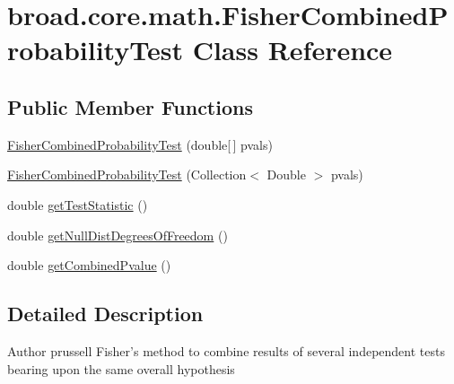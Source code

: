 \hypertarget{classbroad_1_1core_1_1math_1_1_fisher_combined_probability_test}{\section{broad.\+core.\+math.\+Fisher\+Combined\+Probability\+Test Class Reference}
\label{classbroad_1_1core_1_1math_1_1_fisher_combined_probability_test}
}
\subsection*{Public Member Functions}
\begin{DoxyCompactItemize}
\item 
\hyperlink{classbroad_1_1core_1_1math_1_1_fisher_combined_probability_test_a76aa0369ce1e5664e6d5b47314b64453}{Fisher\+Combined\+Probability\+Test} (double\mbox{[}$\,$\mbox{]} pvals)
\item 
\hyperlink{classbroad_1_1core_1_1math_1_1_fisher_combined_probability_test_a3a07dd76af6b6cc420e24494cbd39ca3}{Fisher\+Combined\+Probability\+Test} (Collection$<$ Double $>$ pvals)
\item 
double \hyperlink{classbroad_1_1core_1_1math_1_1_fisher_combined_probability_test_a7cee9fab03e9e054960df0e8fb4e500c}{get\+Test\+Statistic} ()
\item 
double \hyperlink{classbroad_1_1core_1_1math_1_1_fisher_combined_probability_test_aef25df170428bcb78af34b00a5b8bb57}{get\+Null\+Dist\+Degrees\+Of\+Freedom} ()
\item 
double \hyperlink{classbroad_1_1core_1_1math_1_1_fisher_combined_probability_test_a2c696eeb20ff18e619787e0a4a60bfe4}{get\+Combined\+Pvalue} ()
\end{DoxyCompactItemize}


\subsection{Detailed Description}
\begin{DoxyAuthor}{Author}
prussell Fisher's method to combine results of several independent tests bearing upon the same overall hypothesis 
\end{DoxyAuthor}


